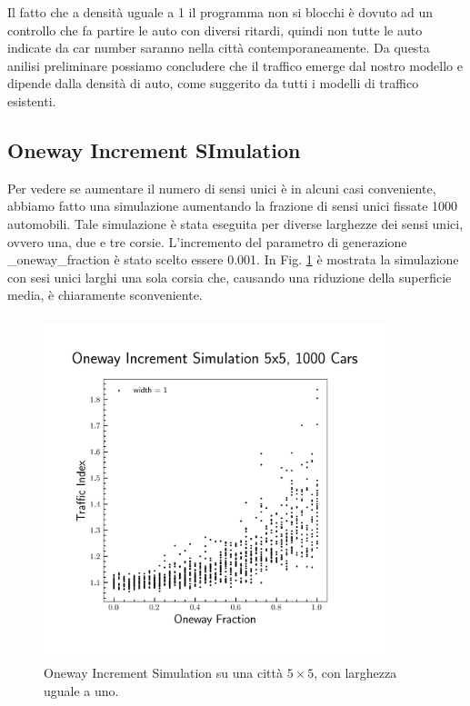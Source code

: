 \documentclass[main.tex]{subfiles}
\begin{document}
        Il fatto che a densità uguale a 1 il programma non si blocchi è dovuto ad un controllo che fa partire le auto con diversi ritardi,
        quindi non tutte le auto indicate da car number saranno nella città contemporaneamente.
        Da questa anilisi preliminare possiamo concludere che il traffico emerge dal nostro modello e dipende dalla densità di auto,
        come suggerito da tutti i modelli di traffico esistenti.

    \subsection{Oneway Increment SImulation}
        Per vedere se aumentare il numero di sensi unici è in alcuni casi conveniente, abbiamo fatto una simulazione aumentando la frazione di sensi unici 
        fissate 1000 automobili. Tale simulazione è stata eseguita per diverse larghezze dei sensi unici, ovvero una, due e tre corsie.
        L'incremento del parametro di generazione \_oneway\_fraction è stato scelto essere 0.001.
        In Fig. \ref{fig:5} è mostrata la simulazione con sesi unici larghi una sola corsia che, causando una riduzione della superficie media, è chiaramente sconveniente.
        
        \begin{figure}[H]
            \centering
            \includegraphics[width=10cm, height=10cm]{oneway_increment_1.png}  
            \caption{Oneway Increment Simulation su una città $5 \times 5$, con larghezza uguale a uno.}
            \label{fig:5}
        \end{figure}
\end{document}
